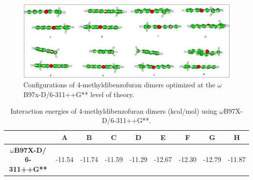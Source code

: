 \begin{figure}[H]
	\begin{center}
		\includegraphics[scale=0.8]{image/4-mO-dim}
	\end{center}
	\caption{Configurations of 4-methyldibenzofuran dimers optimized at the $\omega$B97x-D/6-311++G** level of theory.}
\end{figure}

\begin{table}[H]
	\caption{Interaction energies of  4-methyldibenzofuran dimers (kcal/mol) using $\omega$B97X-D/6-311++G**.}
	\begin{center}
		\begin{tabular}{c c c c c c c c c}
			\hline
			& \textbf{A} & \textbf{B} & \textbf{C} & \textbf{D} & \textbf{E} & \textbf{F} & \textbf{G} & \textbf{H} \\ \hline
			\textbf{$\omega$B97X-D/
				6-311++G**} & -11.54 & -11.74 & -11.59 & -11.29 & -12.67 & -12.30 & -12.79 & -11.87 \\ \hline
		\end{tabular}
	\end{center}
	\label{}
\end{table}



